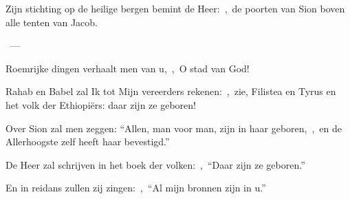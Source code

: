\documentclass[12pt,twoside,a5paper]{article}
\begin{document}
\begin{halfparskip}
   
\end{halfparskip}

\begin{halfparskip}
   Zijn stichting op de heilige bergen bemint de Heer:~\sep\ de poorten van Sion boven alle tenten van Jacob.

  ~--- 

  Roemrijke dingen verhaalt men van u,~\sep\ O stad van God!

  Rahab en Babel zal Ik tot Mijn vereerders rekenen:~\sep\ zie, Filistea en Tyrus en het volk der Ethiopiërs: daar zijn ze geboren!

  Over Sion zal men zeggen: ``Allen, man voor man, zijn in haar geboren,~\sep\ en de Allerhoogste zelf heeft haar bevestigd.''

  De Heer zal schrijven in het boek der volken:~\sep\ ``Daar zijn ze geboren.''

  En in reidans zullen zij zingen:~\sep\ ``Al mijn bronnen zijn in u.''
\end{halfparskip}
\end{document}

